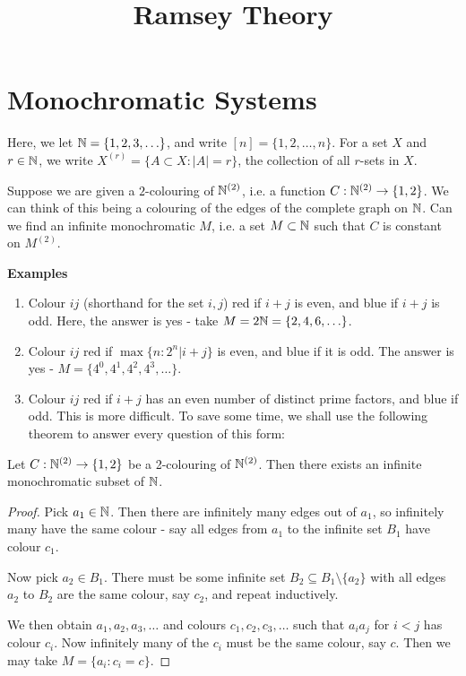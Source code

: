 \documentclass[10pt,a4paper]{article}
\title{Ramsey Theory}
\begin{document}
\maketitle
\tableofcontents
\newpage
\section{Monochromatic Systems}
Here, we let $\mathbb{N} = \{1,2,3,\ldots\}$, and write $[n] = \{1,2,\ldots, n\}$. For a set $X$ and $r \in \mathbb{N}$, we write $X^{(r)} = \{A \subset X : |A|=r\}$, the collection of all $r$-sets in $X$.

Suppose we are given a $2$-colouring of $\mathbb{N}^{(2)}$, i.e. a function $C: \mathbb{N}^{(2)} \to \{1,2\}$. We can think of this being a colouring of the edges of the complete graph on $\mathbb{N}$. Can we find an infinite monochromatic $M$, i.e. a set $M \subset \mathbb{N}$ such that $C$ is constant on $M^{(2)}$.

\textbf{Examples}
\begin{enumerate}
  \item Colour $ij$ (shorthand for the set ${i,j}$) red if $i+j$ is even, and blue if $i+j$ is odd. Here, the answer is yes - take $M = 2\mathbb{N} = \{2,4,6,\ldots\}$.
  \item Colour $ij$ red if $\max\{n: 2^n|i+j\}$ is even, and blue if it is odd. The answer is yes - $M = \{4^0,4^1,4^2,4^3,\ldots\}$.
  \item Colour $ij$ red if $i+j$ has an even number of distinct prime factors, and blue if odd. This is more difficult. To save some time, we shall use the following theorem to answer every question of this form:
\end{enumerate}
\begin{theorem}
  Let $C: \mathbb{N}^{(2)} \to \{1,2\}$ be a 2-colouring of $\mathbb{N}^{(2)}$. Then there exists an infinite monochromatic subset of $\mathbb{N}$.
\end{theorem}
\begin{proof}
  Pick $a_1 \in \mathbb{N}$. Then there are infinitely many edges out of $a_1$, so infinitely many have the same colour - say all edges from $a_1$ to the infinite set $B_1$ have colour $c_1$.

  Now pick $a_2 \in B_1$. There must be some infinite set $B_2 \subseteq B_1\setminus\{a_2\}$ with all edges $a_2$ to $B_2$ are the same colour, say $c_2$, and repeat inductively.

  We then obtain $a_1, a_2, a_3, \ldots$ and colours $c_1, c_2, c_3, \ldots$ such that $a_ia_j$ for $i<j$ has colour $c_i$. Now infinitely many of the $c_i$ must be the same colour, say $c$. Then we may take $M = \{a_i: c_i = c\}$.
\end{proof}
\end{document}
